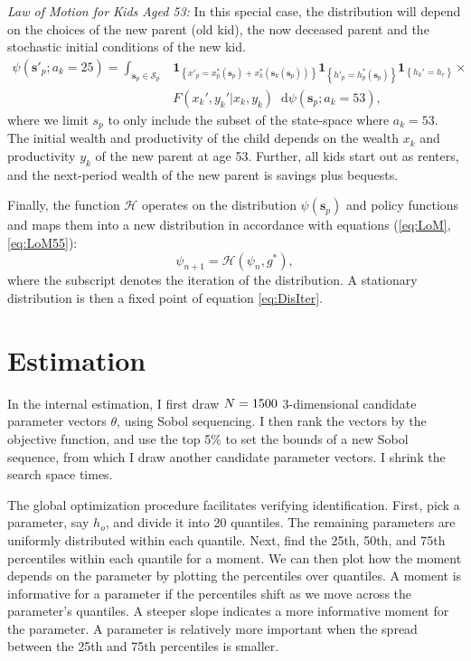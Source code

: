 \documentclass[12pt]{article}
\newcommand*\diff{\mathop{}\!\mathrm{d}}
\begin{document}
\textit{Law of Motion for Kids Aged 53:} In this special case, the distribution will depend on the choices of the new parent (old kid), the now deceased parent and the stochastic initial conditions of the new kid. 
\begin{equation}\label{eq:LoM55}
\begin{split}
\psi(\mathbf{s}'_p;a_k=25) = \int_{\mathbf{s}_p\in \mathcal{S}_p} & 
\mathbf{1}_{\left\{ x'_p = x^*_p(\mathbf s_p) + x^*_k(\mathbf s_k(\mathbf s_p)) \right\} }
\mathbf{1}_{\left\{ h'_p = h^*_p(\mathbf s_p) \right\} } 
\mathbf{1}_{\left\{ h_k' = h_r\right\}} \times \\
&F(x_k',y_k'|x_k,y_k) \diff \psi(\mathbf s_p;a_k=53),
\end{split}
\end{equation}
where we limit $s_p$ to only include the subset of the state-space where $a_k=53$. The initial wealth and productivity of the child depends on the wealth $x_k$ and productivity $y_k$ of the new parent at age 53. Further, all kids start out as renters, and the next-period wealth of the new parent is savings plus bequests.

Finally, the function $\mathcal{H}$ operates on the distribution $\psi(\mathbf{s}_p)$ and policy functions %
and maps them into a new distribution in accordance with equations (\ref{eq:LoM}, \ref{eq:LoM55}):
\begin{equation}\label{eq:DisIter}
\psi_{n+1} = \mathcal{H}(\psi_n,g^*),
\end{equation}
where the subscript denotes the iteration of the distribution. A stationary distribution is then a fixed point of equation \ref{eq:DisIter}.


\section{Estimation}\label{app:SMM}
In the internal estimation, I first draw $N=1500$ 3-dimensional candidate parameter vectors $\theta$, using Sobol sequencing. I then rank the vectors by the objective function, and use the top 5\% to set the bounds of a new Sobol sequence, from which I draw another {\parNest} candidate parameter vectors. I shrink the search space {\parNshrinks} times. 

The global optimization procedure facilitates verifying identification. First, pick a parameter, say $h_o$, and divide it into 20 quantiles. The remaining parameters are uniformly distributed within each quantile. Next, find the 25th, 50th, and 75th percentiles within each quantile for a moment. We can then plot how the moment depends on the parameter by plotting the percentiles over quantiles. A moment is informative for a parameter if the percentiles shift as we move across the parameter's quantiles. A steeper slope indicates a more informative moment for the parameter. A parameter is relatively more important when the spread between the 25th and 75th percentiles is smaller. 
\end{document}

